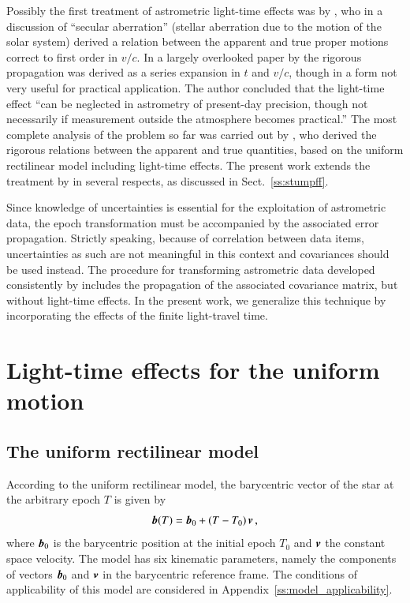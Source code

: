 \documentclass{aa}
\def\vec#1{\ensuremath{\mathchoice{\mbox{\boldmath$\displaystyle#1$}}
{\mbox{\boldmath$\textstyle#1$}}
{\mbox{\boldmath$\scriptstyle#1$}}
{\mbox{\boldmath$\scriptscriptstyle#1$}}}}
\begin{document}
Possibly the first treatment of astrometric light-time effects was by \citet{schwarzschild1894},
who in a discussion of ``secular aberration'' (stellar aberration due to the motion of the solar
system) derived a relation between the apparent and true proper motions correct to first
order in $v/c$. In a largely overlooked paper by \citet{eisner1967} the rigorous propagation
was derived as a series expansion in $t$ and $v/c$, though in a form not very useful for
practical application. The author concluded that the light-time
effect ``can be neglected in astrometry of present-day precision, though not necessarily if
measurement outside the atmosphere becomes practical.'' The most complete analysis of the
problem so far was carried
out by \citet{stumpff1985}, who derived the rigorous relations between the apparent and true
quantities, based on the uniform rectilinear model including light-time effects.
The present work extends the treatment by \citet{stumpff1985} in several respects, as
discussed in Sect.~\ref{ss:stumpff}.

Since knowledge of uncertainties is essential for the exploitation of astrometric data, the
epoch transformation must be accompanied by the associated error propagation.
Strictly speaking, because of correlation between data items, uncertainties as such are not
meaningful in this context and covariances should be used instead. The procedure for transforming
astrometric data developed consistently by \cite{lindegren1995b} includes the propagation of the
associated covariance matrix, but without light-time effects. In the present work,
we generalize this technique by incorporating the effects of the finite light-travel time.

\section{Light-time effects for the uniform motion}\label{s:light-time}

\subsection{The uniform rectilinear model}

According to the uniform rectilinear model, the barycentric vector of the star at
the arbitrary epoch $T$ is given by
\begin{equation}\label{eq:classical-equation-motion}
 \vec{b}(T)=\vec{b}_0+(T-T_0)\,\vec{v}\,,
\end{equation}
where $\vec{b}_0$ is the barycentric position at the initial epoch $T_0$ and
$\vec{v}$ the constant space velocity. The model has six kinematic parameters,
namely the components of vectors $\vec{b}_0$ and $\vec{v}$ in the barycentric
reference frame. The conditions of applicability of this model are considered in
Appendix~\ref{ss:model_applicability}.
\end{document}
